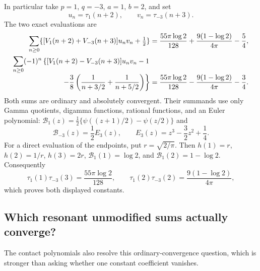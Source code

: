 \documentclass[11pt,letterpaper]{article}
\numberwithin{equation}{section}
\theoremstyle{definition}
\theoremstyle{remark}
\begin{document}
In particular take $p=1$, $q=-3$, $a=1$, $b=2$, and set
\[
 u_n=\tau_1(n+2),\qquad v_n=\tau_{-3}(n+3).
\]
The two exact evaluations are
\begin{align}
 \sum_{n\ge0}\{[V_1(n+2)+V_{-3}(n+3)]u_nv_n+\tfrac12\}
 &=\frac{55\pi\log2}{128}
      +\frac{9(1-\log2)}{4\pi}-\frac54,\label{ct:exampleplus}\\
 \sum_{n\ge0}(-1)^n\left\{
 [V_1(n+2)-V_{-3}(n+3)]u_nv_n-1\right.&\notag\\[-3pt]
 \left.\hspace{6mm}-\frac38\left(\frac1{n+3/2}+\frac1{n+5/2}\right)
 \right\}
 &=\frac{55\pi\log2}{128}
      -\frac{9(1-\log2)}{4\pi}-\frac34.\label{ct:exampleminus}
\end{align}
Both sums are ordinary and absolutely convergent. Their summands use only
Gamma quotients, digamma functions, rational functions, and an Euler
polynomial: $\mathcal B_1(z)=\tfrac12\{\psi((z+1)/2)-\psi(z/2)\}$ and
\[
 \mathcal B_{-3}(z)=\frac12E_3(z),\qquad
 E_3(z)=z^3-\frac32z^2+\frac14.
\]
For a direct evaluation of the endpoints, put $r=\sqrt{2/\pi}$. Then
$h(1)=r$, $h(2)=1/r$, $h(3)=2r$,
$\mathcal B_1(1)=\log2$, and $\mathcal B_1(2)=1-\log2$. Consequently
\[
 \tau_1(1)\tau_{-3}(3)=\frac{55\pi\log2}{128},\qquad
 \tau_1(2)\tau_{-3}(2)=\frac{9(1-\log2)}{4\pi},
\]
which proves both displayed constants.

\subsection{Which resonant unmodified sums actually converge?}

The contact polynomials also resolve this ordinary-convergence question,
which is stronger than asking whether one constant coefficient vanishes.
\end{document}
